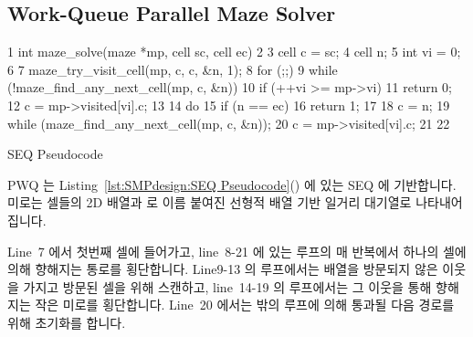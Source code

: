 \subsection{Work-Queue Parallel Maze Solver}
\label{sec:SMPdesign:Work-Queue Parallel Maze Solver}

\begin{listing}[tbp]
{ \scriptsize
\begin{verbbox}
  1 int maze_solve(maze *mp, cell sc, cell ec)
  2 {
  3   cell c = sc;
  4   cell n;
  5   int vi = 0;
  6 
  7   maze_try_visit_cell(mp, c, c, &n, 1);
  8   for (;;) {
  9     while (!maze_find_any_next_cell(mp, c, &n)) {
 10       if (++vi >= mp->vi)
 11         return 0;
 12       c = mp->visited[vi].c;
 13     }
 14     do {
 15       if (n == ec) {
 16         return 1;
 17       }
 18       c = n;
 19     } while (maze_find_any_next_cell(mp, c, &n));
 20     c = mp->visited[vi].c;
 21   }
 22 }
\end{verbbox}
}
\centering
\theverbbox
\caption{SEQ Pseudocode}
\label{lst:SMPdesign:SEQ Pseudocode}
\end{listing}

PWQ 는 Listing~\ref{lst:SMPdesign:SEQ Pseudocode}() 에 있는 SEQ
에 기반합니다.
미로는 셀들의 2D 배열과  로 이름 붙여진 선형적 배열 기반 일거리
대기열로 나타내어집니다.

Line~7 에서 첫번째 셀에 들어가고, line~8-21 에 있는 루프의 매 반복에서 하나의
셀에 의해 향해지는 통로를 횡단합니다.
Line9-13 의 루프에서는  배열을 방문되지 않은 이웃을 가지고
방문된 셀을 위해 스캔하고, line~14-19 의 루프에서는 그 이웃을 통해 향해지는
작은 미로를 횡단합니다.
Line~20 에서는 밖의 루프에 의해 통과될 다음 경로를 위해 초기화를 합니다.


